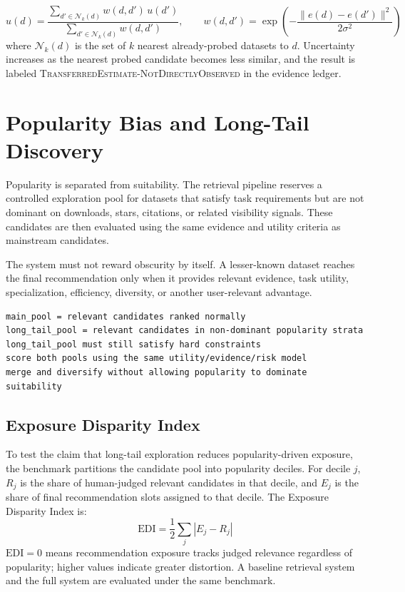 \documentclass[11pt]{article}
\begin{document}
\begin{equation}
\hat{u}(d) = \frac{\sum_{d' \in \mathcal{N}_k(d)} w(d,d')\, u(d')}{\sum_{d' \in \mathcal{N}_k(d)} w(d,d')},
\qquad
w(d,d') = \exp\!\left(-\frac{\lVert e(d) - e(d') \rVert^2}{2\sigma^2}\right)
\end{equation}
where $\mathcal{N}_k(d)$ is the set of $k$ nearest already-probed datasets to $d$. Uncertainty increases as
the nearest probed candidate becomes less similar, and the result is labeled
\textsc{TransferredEstimate-NotDirectlyObserved} in the evidence ledger.

\section{Popularity Bias and Long-Tail Discovery}
Popularity is separated from suitability. The retrieval pipeline reserves a controlled exploration pool for
datasets that satisfy task requirements but are not dominant on downloads, stars, citations, or related
visibility signals. These candidates are then evaluated using the same evidence and utility criteria as
mainstream candidates.

The system must not reward obscurity by itself. A lesser-known dataset reaches the final recommendation
only when it provides relevant evidence, task utility, specialization, efficiency, diversity, or another
user-relevant advantage.

\begin{lstlisting}[basicstyle=\ttfamily\footnotesize]
main_pool = relevant candidates ranked normally
long_tail_pool = relevant candidates in non-dominant popularity strata
long_tail_pool must still satisfy hard constraints
score both pools using the same utility/evidence/risk model
merge and diversify without allowing popularity to dominate suitability
\end{lstlisting}

\subsection{Exposure Disparity Index}
\label{sec:bias-calibration}
To test the claim that long-tail exploration reduces popularity-driven exposure, the benchmark partitions
the candidate pool into popularity deciles. For decile $j$, $R_j$ is the share of human-judged relevant
candidates in that decile, and $E_j$ is the share of final recommendation slots assigned to that decile.
The Exposure Disparity Index is:
\begin{equation}
\mathrm{EDI} = \frac{1}{2}\sum_j \left| E_j - R_j \right|
\end{equation}
$\mathrm{EDI} = 0$ means recommendation exposure tracks judged relevance regardless of popularity; higher
values indicate greater distortion. A baseline retrieval system and the full system are evaluated under the
same benchmark.
\end{document}
